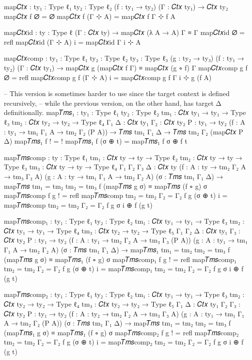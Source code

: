\begin{code}[hide]
map𝐶𝑡𝑥 : {ty₁ : Type ℓ₁} {ty₂ : Type ℓ₂} (f : ty₁ → ty₂) (Γ : 𝐶𝑡𝑥 ty₁) → 𝐶𝑡𝑥 ty₂
map𝐶𝑡𝑥 f ∅ = ∅
map𝐶𝑡𝑥 f (Γ ⊹ A) = map𝐶𝑡𝑥 f Γ ⊹ f A

map𝐶𝑡𝑥id : {ty : Type ℓ} (Γ : 𝐶𝑡𝑥 ty) → map𝐶𝑡𝑥 (λ A → A) Γ ≡ Γ
map𝐶𝑡𝑥id ∅ = refl
map𝐶𝑡𝑥id (Γ ⊹ A) i = map𝐶𝑡𝑥id Γ i ⊹ A

map𝐶𝑡𝑥comp : {ty₁ : Type ℓ₁} {ty₂ : Type ℓ₂} {ty₃ : Type ℓ₃} (g : ty₂ → ty₃) (f : ty₁ → ty₂)
  (Γ : 𝐶𝑡𝑥 ty₁) → map𝐶𝑡𝑥 g (map𝐶𝑡𝑥 f Γ) ≡ map𝐶𝑡𝑥 (g ∘ f) Γ
map𝐶𝑡𝑥comp g f ∅ = refl
map𝐶𝑡𝑥comp g f (Γ ⊹ A) i = map𝐶𝑡𝑥comp g f Γ i ⊹ g (f A)

-- This version is sometimes harder to use since the target context is defined recursively,
-- while the previous version, on the other hand, has target Δ definitionally.
map𝑇𝑚𝑠₁ : {ty₁ : Type ℓ₁} {ty₂ : Type ℓ₂} {tm₁ : 𝐶𝑡𝑥 ty₁ → ty₁ → Type ℓ₃}
  {tm₂ : 𝐶𝑡𝑥 ty₂ → ty₂ → Type ℓ₄} {Γ₁ Δ : 𝐶𝑡𝑥 ty₁} {Γ₂ : 𝐶𝑡𝑥 ty₂} {P : ty₁ → ty₂}
  (f : {A : ty₁} → tm₁ Γ₁ A → tm₂ Γ₂ (P A)) → 𝑇𝑚𝑠 tm₁ Γ₁ Δ → 𝑇𝑚𝑠 tm₂ Γ₂ (map𝐶𝑡𝑥 P Δ)
map𝑇𝑚𝑠₁ f ! = !
map𝑇𝑚𝑠₁ f (σ ⊕ t) = map𝑇𝑚𝑠₁ f σ ⊕ f t

map𝑇𝑚𝑠comp : {ty : Type ℓ₁} {tm₁ : 𝐶𝑡𝑥 ty → ty → Type ℓ₂} {tm₂ : 𝐶𝑡𝑥 ty → ty → Type ℓ₃}
  {tm₃ : 𝐶𝑡𝑥 ty → ty → Type ℓ₄} {Γ₁ Γ₂ Γ₃ Δ : 𝐶𝑡𝑥 ty} (f : {A : ty} → tm₂ Γ₂ A → tm₃ Γ₃ A)
  (g : {A : ty} → tm₁ Γ₁ A → tm₂ Γ₂ A) (σ : 𝑇𝑚𝑠 tm₁ Γ₁ Δ) →
  map𝑇𝑚𝑠 {tm₁ = tm₂} {tm₂ = tm₃} f (map𝑇𝑚𝑠 g σ) ≡ map𝑇𝑚𝑠 (f ∘ g) σ
map𝑇𝑚𝑠comp f g ! = refl
map𝑇𝑚𝑠comp {tm₂ = tm₂} {Γ₂ = Γ₂} f g (σ ⊕ t) i =
  map𝑇𝑚𝑠comp {tm₂ = tm₂} {Γ₂ = Γ₂} f g σ i ⊕ f (g t)

map𝑇𝑚𝑠comp₁ : {ty₁ : Type ℓ₁} {ty₂ : Type ℓ₂} {tm₁ : 𝐶𝑡𝑥 ty₁ → ty₁ → Type ℓ₃}
  {tm₂ : 𝐶𝑡𝑥 ty₁ → ty₁ → Type ℓ₄} {tm₃ : 𝐶𝑡𝑥 ty₂ → ty₂ → Type ℓ₅} {Γ₁ Γ₂ Δ : 𝐶𝑡𝑥 ty₁}
  {Γ₃ : 𝐶𝑡𝑥 ty₂} {P : ty₁ → ty₂} (f : {A : ty₁} → tm₂ Γ₂ A → tm₃ Γ₃ (P A))
  (g : {A : ty₁} → tm₁ Γ₁ A → tm₂ Γ₂ A)  (σ : 𝑇𝑚𝑠 tm₁ Γ₁ Δ) →
  map𝑇𝑚𝑠₁ {tm₁ = tm₂} {tm₂ = tm₃} f (map𝑇𝑚𝑠 g σ) ≡ map𝑇𝑚𝑠₁ (f ∘ g) σ
map𝑇𝑚𝑠comp₁ f g ! = refl
map𝑇𝑚𝑠comp₁ {tm₂ = tm₂} {Γ₂ = Γ₂} f g (σ ⊕ t) i =
  map𝑇𝑚𝑠comp₁ {tm₂ = tm₂} {Γ₂ = Γ₂} f g σ i ⊕ f (g t)

map𝑇𝑚𝑠comp₂ : {ty₁ : Type ℓ₁} {ty₂ : Type ℓ₂} {tm₁ : 𝐶𝑡𝑥 ty₁ → ty₁ → Type ℓ₃}
  {tm₂ : 𝐶𝑡𝑥 ty₂ → ty₂ → Type ℓ₄} {tm₃ : 𝐶𝑡𝑥 ty₂ → ty₂ → Type ℓ₅} {Γ₁ Δ : 𝐶𝑡𝑥 ty₁}
  {Γ₂ Γ₃ : 𝐶𝑡𝑥 ty₂} {P : ty₁ → ty₂} (f : {A : ty₂} → tm₂ Γ₂ A → tm₃ Γ₃ A)
  (g : {A : ty₁} → tm₁ Γ₁ A → tm₂ Γ₂ (P A))  (σ : 𝑇𝑚𝑠 tm₁ Γ₁ Δ) →
  map𝑇𝑚𝑠 {tm₁ = tm₂} {tm₂ = tm₃} f (map𝑇𝑚𝑠₁ g σ) ≡ map𝑇𝑚𝑠₁ (f ∘ g) σ
map𝑇𝑚𝑠comp₂ f g ! = refl
map𝑇𝑚𝑠comp₂ {tm₂ = tm₂} {Γ₂ = Γ₂} f g (σ ⊕ t) i =
  map𝑇𝑚𝑠comp₂ {tm₂ = tm₂} {Γ₂ = Γ₂} f g σ i ⊕ f (g t)


\end{code}
